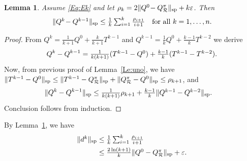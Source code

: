 \documentclass{article}
\newtheorem{lemma}[theorem]{Lemma}
\theoremstyle{definition}
\theoremstyle{remark}
\newcommand{\cA}{\mathcal{A}}
\newcommand{\cS}{\mathcal{S}}
\newcommand{\cR}{\mathcal{R}}
\renewcommand{\sp}[1]{\|{#1}\|_\text{\rm sp}}
\begin{document}
\begin{lemma}\label{Le:dos} Assume \eqref{Eq:Ek} and let $\rho_k=2\sp{Q^0\!-Q^\pi_\cR}+k\varepsilon$. Then 
$$\mbox{$\sp{Q^{k}\!-Q^{k-1}} \le \frac{1}{k}\sum_{i=1}^{k}\frac{\rho_{i+1}}{i+1}\quad \text{for all} \,\, k=1,\ldots,n.$}$$ 
\end{lemma}
\begin{proof} From 
$Q^{k}=\frac{1}{k+1}Q^0+\frac{k}{k+1}T^{k-1}$ and
$Q^{k-1}=\frac{1}{k}Q^0+\frac{k-1}{k}T^{k-2}$
we derive
\begin{equation*} \label{eq:aux}
    Q^{k}-Q^{k-1}
    =\mbox{$ \frac{1}{k(k+1)}(T^{k-1}-Q^0) + \frac{k-1}{k}(T^{k-1}-T^{k-2})$}.
\end{equation*}
Now, from previous proof of Lemma~\ref{Le:uno}, we have $\sp{T^{k-1}-Q^0}\leq \sp{T^{k-1}-Q^\pi_\cR} +\sp{Q^\pi_\cR-Q^0}\leq\rho_{k+1}$,  
and
\begin{align*}
    \sp{Q^{k}-Q^{k-1}} 
    &\le \mbox{$\frac{1}{k(k+1)}\rho_{k+1} +  \frac{k-1}{k}\sp{Q^{k-1}- Q^{k-2}}$}.
\end{align*}
Conclusion follows from induction.
\end{proof}

By Lemma~\ref{Le:dos},  we have
\begin{align*}
    \mbox{$\sp{d^k}$}&\leq\mbox{$\frac{1}{k}\sum_{i=1}^{k}\frac{\rho_{i+1}}{i+1}$}\\
    &\leq \mbox{$\frac{2\ln(k+1)}{k}\sp{Q^0-Q^\pi_\cR}+\varepsilon$}.
\end{align*}





\end{document}
